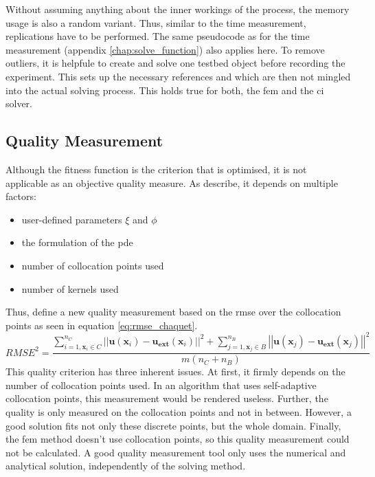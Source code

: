 \documentclass[./\jobname.tex]{subfiles}
\begin{document}
Without assuming anything about the inner workings of the process, the memory usage is also a random variant. Thus, similar to the time measurement, replications have to be performed. The same pseudocode as for the time measurement (appendix \ref{chap:solve_function}) also applies here. To remove outliers, it is helpfule to create and solve one testbed object before recording the experiment. This sets up the necessary references and which are then not mingled into the actual solving process. This holds true for both, the \gls{fem} and the \gls{ci} solver.  

\subsection{Quality Measurement}
\label{chap:metric_quality}
Although the fitness function is the criterion that is optimised, it is not applicable as an objective quality measure. As \cite{chaquet_using_2019} describe, it depends on multiple factors:
\begin{itemize}
	\item user-defined parameters $\xi$ and $\phi$ 
	\item the formulation of the \gls{pde} 
	\item number of collocation points used 
	\item number of kernels used
\end{itemize}
Thus, \cite{chaquet_using_2019} define a new quality measurement based on the \gls{rmse} over the collocation points as seen in equation \ref{eq:rmse_chaquet}. 
\begin{equation}
\label{eq:rmse_chaquet}
RMSE^2 = \frac{\sum_{i=1, \mathbf{x}_i \in C}^{n_C} \left|\left| \mathbf{u}(\mathbf{x}_i) - \mathbf{u_{ext}}(\mathbf{x}_i) \right|\right|^2 + \sum_{j=1, \mathbf{x}_j \in B}^{n_B} \left|\left| \mathbf{u}(\mathbf{x}_j) - \mathbf{u_{ext}}(\mathbf{x}_j) \right|\right|^2}{m(n_C + n_B)}
\end{equation}
This quality criterion has three inherent issues. At first, it firmly depends on the number of collocation points used. In an algorithm that uses self-adaptive collocation points, this measurement would be rendered useless. Further, the quality is only measured on the collocation points and not in between. However, a good solution fits not only these discrete points, but the whole domain. Finally, the \gls{fem} method doesn't use collocation points, so this quality measurement could not be calculated. A good quality measurement tool only uses the numerical and analytical solution, independently of the solving method. \\
\end{document}
